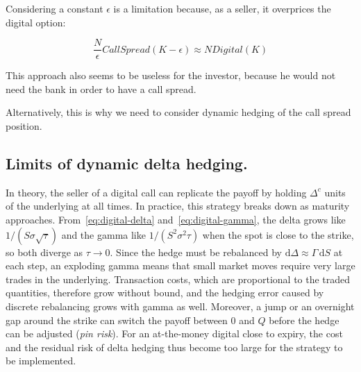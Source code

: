 \documentclass[11pt,a4paper]{article}
\theoremstyle{remark}
\begin{document}
Considering a constant $\epsilon$ is a limitation because, as a seller, it overprices the digital option:

\begin{equation}
  \frac{N}{\epsilon} CallSpread(K- \epsilon) \approx N Digital(K)
\end{equation}

This approach also seems to be useless for the investor, because he would not need the bank in order to have a call spread.


Alternatively, this is why we need to consider dynamic hedging of the call spread position.


\subsection{Limits of dynamic delta hedging.}
In theory, the seller of a digital call can replicate the payoff by holding
$\Delta^{c}$ units of the underlying at all times. In practice, this strategy
breaks down as maturity approaches. From~\eqref{eq:digital-delta}
and~\eqref{eq:digital-gamma}, the delta grows like $1/(S\sigma\sqrt{\tau})$ and
the gamma like $1/(S^2\sigma^2\tau)$ when the spot is close to the strike, so
both diverge as $\tau \to 0$. Since the hedge must be rebalanced by
$\mathrm{d}\Delta \approx \Gamma\,\mathrm{d}S$ at each step, an exploding gamma
means that small market moves require very large trades in the underlying.
Transaction costs, which are proportional to the traded quantities, therefore
grow without bound, and the hedging error caused by discrete rebalancing grows
with gamma as well. Moreover, a jump or an overnight gap around the strike can
switch the payoff between $0$ and $Q$ before the hedge can be adjusted
(\emph{pin risk}). For an at-the-money digital close to expiry, the cost and the
residual risk of delta hedging thus become too large for the strategy to be
implemented.
\end{document}
